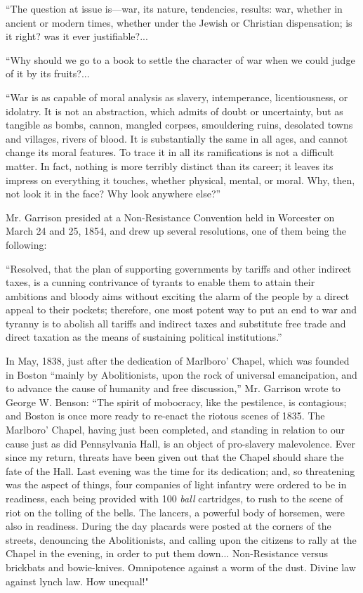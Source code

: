 \documentclass{book}
\begin{document}
“The question at issue is—war, its nature, tendencies, results: war, whether in ancient or modern times, whether under the Jewish or Christian dispensation; is it right? was it ever justifiable?...

“Why should we go to a book to settle the character of war when we could judge of it by its fruits?...

“War is as capable of moral analysis as slavery, intemperance, licentiousness, or idolatry. It is not an abstraction, which admits of doubt or uncertainty, but as tangible as bombs, cannon, mangled corpses, smouldering ruins, desolated towns and villages, rivers of blood. It is substantially the same in all ages, and cannot change its moral features. To trace it in all its ramifications is not a difficult matter. In fact, nothing is more terribly distinct than its career; it leaves its impress on everything it touches, whether physical, mental, or moral. Why, then, not look it in the face? Why look anywhere else?”\footnotemark[6]

Mr. Garrison presided at a Non-Resistance Convention held in Worcester on March 24 and 25, 1854, and drew up several resolutions, one of them being the following:

“Resolved, that the plan of supporting governments by tariffs and other indirect taxes, is a cunning contrivance of tyrants to enable them to attain their ambitions and bloody aims without exciting the alarm of the people by a direct appeal to their pockets; therefore, one most potent way to put an end to war and tyranny is to abolish all tariffs and indirect taxes and substitute free trade and direct taxation as the means of sustaining political institutions.”\footnotemark[7]

In May, 1838, just after the dedication of Marlboro’ Chapel, which was founded in Boston “mainly by Abolitionists, upon the rock of universal emancipation, and to advance the cause of humanity and free discussion,” Mr. Garrison wrote to George W. Benson: “The spirit of mobocracy, like the pestilence, is contagious; and Boston is once more ready to re-enact the riotous scenes of 1835. The Marlboro’ Chapel, having just been completed, and standing in relation to our cause just as did Pennsylvania Hall, is an object of pro-slavery malevolence. Ever since my return, threats have been given out that the Chapel should share the fate of the Hall. Last evening was the time for its dedication; and, so threatening was the aspect of things, four companies of light infantry were ordered to be in readiness, each being provided with 100 \emph{ball} cartridges, to rush to the scene of riot on the tolling of the bells. The lancers, a powerful body of horsemen, were also in readiness. During the day placards were posted at the corners of the streets, denouncing the Abolitionists, and calling upon the citizens to rally at the Chapel in the evening, in order to put them down... Non-Resistance versus brickbats and bowie-knives. Omnipotence against a worm of the dust. Divine law against lynch law. How unequal!"\footnotemark[8]
\end{document}
